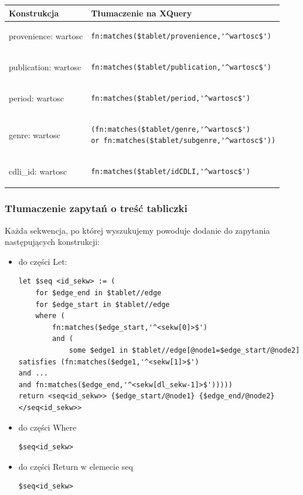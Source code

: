 \begin{longtable}{|p{2.5in}|p{3.5in}|}
\hline
{\bf Konstrukcja} & {\bf Tłumaczenie na XQuery}\\
\hline
\endhead
provenience: wartosc & \begin{verbatim}fn:matches($tablet/provenience,'^wartosc$')\end{verbatim}
\\
\hline
publication: wartosc & \begin{verbatim}fn:matches($tablet/publication,'^wartosc$')\end{verbatim}
\\
\hline
period: wartosc & \begin{verbatim}fn:matches($tablet/period,'^wartosc$')\end{verbatim}
\\
\hline
genre: wartosc & \begin{verbatim}(fn:matches($tablet/genre,'^wartosc$')
or fn:matches($tablet/subgenre,'^wartosc$'))\end{verbatim}
\\
\hline
cdli\_id: wartosc & \begin{verbatim}fn:matches($tablet/idCDLI,'^wartosc$')\end{verbatim}
\\
\hline
\end{longtable}


\subsubsection{Tłumaczenie zapytań o treść tabliczki}
Każda sekwencja, po której wyszukujemy powoduje dodanie do zapytania następujących konstrukcji:
\begin{itemize}
\item{do części Let:}
\begin{verbatim}
let $seq <id_sekw> := (
	for $edge_end in $tablet//edge
	for $edge_start in $tablet//edge
	where (
		fn:matches($edge_start,'^<sekw[0]>$')
		and (
			some $edge1 in $tablet//edge[@node1=$edge_start/@node2]
satisfies (fn:matches($edge1,'^<sekw[1]>$')
and ... 
and fn:matches($edge_end,'^<sekw[dl_sekw-1]>$')))))
return <seq<id_sekw>> {$edge_start/@node1} {$edge_end/@node2} </seq<id_sekw>>
\end{verbatim}
\item{do części Where}
\begin{verbatim}
$seq<id_sekw>
\end{verbatim}
\item{do części Return w elemecie seq}
\begin{verbatim}
$seq<id_sekw>
\end{verbatim}
\end{itemize}




